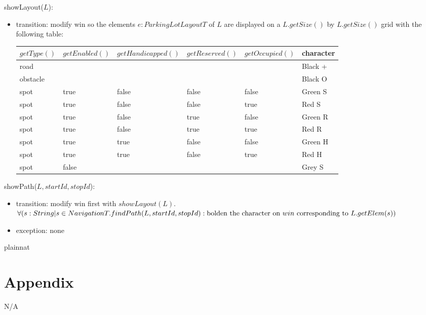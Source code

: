 \documentclass[12pt, titlepage]{article}
\begin{document}
\noindent showLayout($L$):
\begin{itemize} 
\item transition: modify win so the elements $e :ParkingLotLayoutT$ of $L$ are
displayed on a $L.getSize()$ by $L.getSize()$ grid with the following table: 

\begin{tabular}{l l l l l l}
\hline
$getType()$ & $getEnabled()$ & $getHandicapped()$ & $getReserved()$ &
$getOccupied()$ & character \\
\hline
road & ~  & ~  & ~  & ~  & Black +\\
obstacle & ~  & ~  & ~  & ~  & Black O\\
spot & true  & false  & false  & false  & Green S\\
spot & true  & false  & false  & true  & Red S\\
spot & true  & false  & true  & false  & Green R\\
spot & true  & false  & true  & true  & Red R\\
spot & true  & true  & false  & false  & Green H\\
spot & true  & true  & false  & true  & Red H\\
spot & false  & ~  & ~  & ~  & Grey S\\
\hline
\end{tabular}
\end{itemize}

\newpage

\noindent showPath($L, startId, stopId$):
\begin{itemize} 
\item transition: modify win first with $showLayout(L)$. \\
$\forall (s : String | s \in NavigationT.findPath(L, startId, stopId) : \\
\text{bolden the character on } win \text{ corresponding to } L.getElem(s))$ 
\item exception: none
\end{itemize}

\newpage

 {plainnat}


\newpage

\section{Appendix} \label{Appendix} N/A
\end{document}
